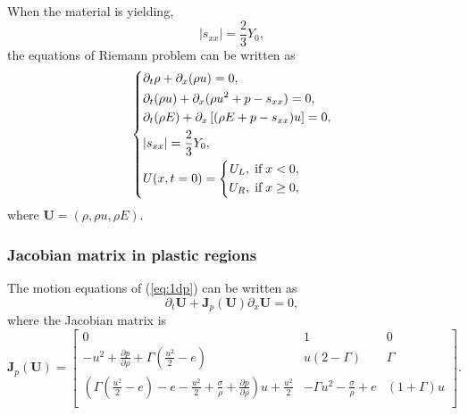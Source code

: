 \documentclass{article}
\numberwithin{equation}{section}
\numberwithin{table}{section}
\begin{document}
When the material is yielding,
\begin{equation}
  |s_{xx}| = \frac{2}{3}Y_0,
\end{equation}
the equations of Riemann problem  can be written as
\begin{equation}\label{eq:1dp}
   \left\{ \begin{aligned}
       & \partial _t \rho +\partial_x(\rho u)=0,\\
       & \partial _t (\rho u)+\partial_x(\rho u^2 + p -s_{xx})=0,\\
       &\partial _t (\rho E)+\partial_x\left[(\rho E + p -s_{xx})u\right]=0,\\
& |s_{xx}| = \frac{2}{3}Y_{0}, \\
       &U(x,t = 0) = \left\{\begin{aligned}
           U_L, \hspace{0.1cm} \text{if} \hspace{0.1cm} x<0, \\
           U_R, \hspace{0.1cm} \text{if} \hspace{0.1cm} x\ge 0, \\
       \end{aligned}\right.
     \end{aligned}
  \right.
\end{equation}
where $\mathbf{U} = (\rho, \rho u, \rho E )$.
  \subsubsection{Jacobian matrix in  plastic  regions}
 The motion equations of (\ref{eq:1dp}) can be written as
\begin{equation}
  \partial_t \mathbf{{U}} + \mathbf{J}_p(\mathbf{U})\partial_x \mathbf{{U}}= 0,
\end{equation}
 where the Jacobian matrix is
\begin{equation}
\mathbf{J}_p(\mathbf{U}) = \left[\begin{array}{lll}
      0 & 1 & 0   \\
      -u^2 + \frac{\partial p}{\partial \rho} +\Gamma(\frac{u^2}{2}-e)& u(2-\Gamma)& \Gamma \\
	  (\Gamma(\frac{u^2}{2}-e)-e-\frac{u^2}{2}+\frac{\sigma}{\rho}+\frac{\partial p}{\partial \rho})u +\frac{u^2}{2} & -\Gamma u^2 -\frac{\sigma}{\rho} +e & (1+\Gamma)u\\
\end{array}
\right].
\end{equation}
\end{document}
